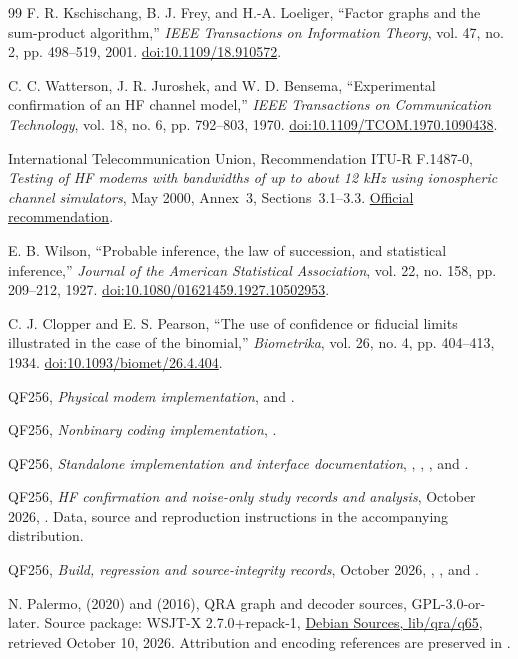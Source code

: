 \documentclass[11pt,a4paper]{article}
\begin{document}
\begin{thebibliography}{99}
F. R. Kschischang, B. J. Frey, and H.-A. Loeliger,
``Factor graphs and the sum-product algorithm,''
\emph{IEEE Transactions on Information Theory}, vol. 47, no. 2,
pp. 498--519, 2001. \href{https://doi.org/10.1109/18.910572}{doi:10.1109/18.910572}.

C. C. Watterson, J. R. Juroshek, and W. D. Bensema,
``Experimental confirmation of an HF channel model,''
\emph{IEEE Transactions on Communication Technology}, vol. 18, no. 6,
pp. 792--803, 1970.
\href{https://doi.org/10.1109/TCOM.1970.1090438}{doi:10.1109/TCOM.1970.1090438}.

International Telecommunication Union, Recommendation ITU-R F.1487-0,
\emph{Testing of HF modems with bandwidths of up to about 12 kHz using
ionospheric channel simulators}, May 2000, Annex~3, Sections~3.1--3.3.
\href{https://www.itu.int/rec/R-REC-F.1487-0-200005-I/en}{Official recommendation}.

E. B. Wilson, ``Probable inference, the law of succession, and statistical
inference,'' \emph{Journal of the American Statistical Association},
vol. 22, no. 158, pp. 209--212, 1927.
\href{https://doi.org/10.1080/01621459.1927.10502953}{doi:10.1080/01621459.1927.10502953}.

C. J. Clopper and E. S. Pearson, ``The use of confidence or fiducial limits
illustrated in the case of the binomial,'' \emph{Biometrika}, vol. 26,
no. 4, pp. 404--413, 1934.
\href{https://doi.org/10.1093/biomet/26.4.404}{doi:10.1093/biomet/26.4.404}.

QF256, \emph{Physical modem implementation},
 and .

QF256, \emph{Nonbinary coding implementation},
.

QF256, \emph{Standalone implementation and interface documentation},
, ,
, and .

QF256, \emph{HF confirmation and noise-only study records and analysis},
October 2026, . Data, source and reproduction instructions
in the accompanying distribution.

QF256, \emph{Build, regression and source-integrity records}, October 2026,
, , and
.

N. Palermo,  (2020) and
 (2016), QRA graph and decoder sources,
GPL-3.0-or-later. Source package: WSJT-X 2.7.0+repack-1,
\href{https://sources.debian.org/src/wsjtx/2.7.0\%2Brepack-1/lib/qra/q65/}{Debian Sources, lib/qra/q65},
retrieved October 10, 2026. Attribution and encoding references are preserved
in .

\end{thebibliography}
\end{document}
